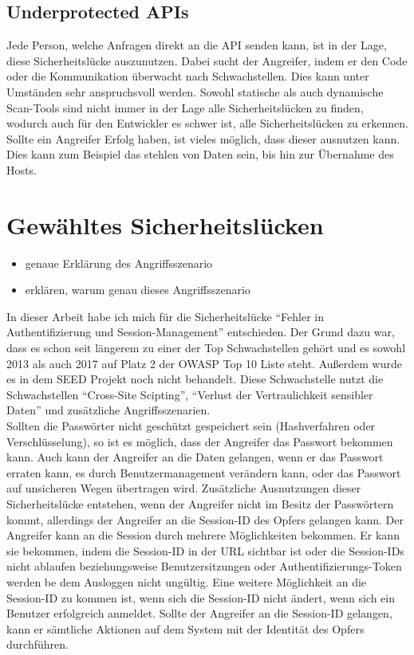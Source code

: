 \subsection{Underprotected APIs}
Jede Person, welche Anfragen direkt an die API senden kann, ist in der Lage, diese Sicherheitslücke auszunutzen. Dabei sucht der Angreifer, indem er den Code oder die Kommunikation überwacht nach Schwachstellen. Dies kann unter Umständen sehr anspruchsvoll werden. Sowohl statische als auch dynamische Scan-Tools sind nicht immer in der Lage alle Sicherheitslücken zu finden, wodurch auch für den Entwickler es schwer ist, alle Sicherheitslücken zu erkennen. Sollte ein Angreifer Erfolg haben, ist vieles möglich, dass dieser ausnutzen kann. Dies kann zum Beispiel das stehlen von Daten sein, bis hin zur Übernahme des Hosts. \\
\section{Gewähltes Sicherheitslücken}
\begin{itemize}
	\item genaue Erklärung des Angriffsszenario
	\item erklären, warum genau dieses Angriffsszenario
\end{itemize}
In dieser Arbeit habe ich mich für die Sicherheitslücke \enquote{Fehler in Authentifizierung und Session-Management} entschieden. Der Grund dazu war, dass es schon seit längerem zu einer der Top Schwachstellen gehört und es sowohl 2013 als auch 2017 auf Platz 2 der OWASP Top 10 Liste steht. Außerdem wurde es in dem SEED Projekt noch nicht behandelt. Diese Schwachstelle nutzt die Schwachstellen \enquote{Cross-Site Scipting}, \enquote{Verlust der Vertraulichkeit sensibler Daten} und zusätzliche Angriffsszenarien. \\
Sollten die Passwörter nicht geschützt gespeichert sein (Hashverfahren oder Verschlüsselung), so ist es möglich, dass der Angreifer das Passwort bekommen kann. Auch kann der Angreifer an die Daten gelangen, wenn er das Passwort erraten kann, es durch Benutzermanagement verändern kann, oder das Passwort auf unsicheren Wegen übertragen wird. Zusätzliche Ausnutzungen dieser Sicherheitslücke entstehen, wenn der Angreifer nicht im Besitz der Passwörtern kommt, allerdings der Angreifer an die Session-ID des Opfers gelangen kann. Der Angreifer kann an die Session durch mehrere Möglichkeiten bekommen. Er kann sie bekommen, indem die Session-ID in der URL sichtbar ist oder die Session-IDs nicht ablaufen beziehungsweise Benutzersitzungen oder Authentifizierungs-Token werden be dem Ausloggen nicht ungültig. Eine weitere Möglichkeit an die Session-ID zu kommen ist, wenn sich die Session-ID nicht ändert, wenn sich ein Benutzer erfolgreich anmeldet. Sollte der Angreifer an die Session-ID gelangen, kann er sämtliche Aktionen auf dem System mit der Identität des Opfers durchführen. \\
